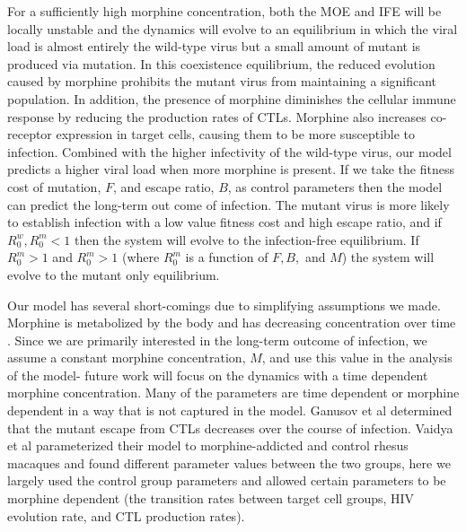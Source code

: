 \documentclass[11pt, oneside]{article}    %
\begin{document}
\vspace{5mm}

	For a sufficiently high morphine concentration, both the MOE and IFE will be locally unstable and the dynamics will evolve to an equilibrium in which the viral load is almost entirely the wild-type virus but a small amount of mutant is produced via mutation. In this coexistence equilibrium, the reduced evolution caused by morphine prohibits the mutant virus from maintaining a significant population. In addition, the presence of morphine diminishes the cellular immune response by reducing the production rates of CTLs. Morphine also increases co-receptor expression in target cells, causing them to be more susceptible to infection. Combined with the higher infectivity of the wild-type virus, our model predicts a higher viral load when more morphine is present. If we take the fitness cost of mutation, $F$, and escape ratio, $B$, as control parameters then the model can predict the long-term out come of infection. The mutant virus is more likely to establish infection with a low value fitness cost and high escape ratio, and if $R_0^w, R_0^m < 1$ then the system will evolve to the infection-free equilibrium. If $R_0^m >1$ and $R_0^m > 1$ (where $R_0^m$ is a function of $F,B,$ and $M$) the system will evolve to the mutant only equilibrium.   

\vspace{5mm}

	Our model has several short-comings due to simplifying assumptions we made. Morphine is metabolized by the body and has decreasing concentration over time \cite{Olkkola}. Since we are primarily interested in the long-term outcome of infection, we assume a constant morphine concentration, $M$, and use this value in the analysis of the model- future work will focus on the dynamics with a time dependent morphine concentration. Many of the parameters are time dependent or morphine dependent in a way that is not captured in the model. Ganusov et al \cite{Ganusov2006, Ganusov2011} determined that the mutant escape from CTLs decreases over the course of infection. Vaidya et al \cite{Vaidya} parameterized their model to morphine-addicted and control rhesus macaques and found different parameter values between the two groups, here we largely used the control group parameters and allowed certain parameters to be morphine dependent (the transition rates between target cell groups, HIV evolution rate, and CTL production rates). 

\vspace{5mm}
\end{document}
